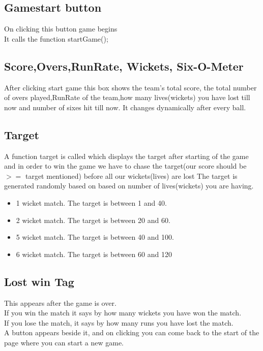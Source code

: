 \documentclass{article}
\begin{document}
\subsection{Gamestart button}
On clicking this button game begins\\
It calls the function startGame();
\subsection{Score,Overs,RunRate, Wickets, Six-O-Meter}
After clicking start game this box shows the team's total score, the total number of overs played,RunRate of the team,how many lives(wickets) you have lost till now and number of sixes hit till now. It changes dynamically after every ball.
\subsection{Target}
A function target is called which displays the target after starting of the game and in order to win the game we have to chase the target(our score should be $>=$ target mentioned) before all our wickets(lives) are lost
The target is generated randomly based on based on number of lives(wickets) you are having.
\begin{itemize}
    \item 1 wicket match. The target is between 1 and 40.
    \item 2 wicket match. The target is between 20 and 60.
    \item 5 wicket match. The target is between 40 and 100. 
    \item 6 wicket match. The target is between 60 and 120 
\end{itemize}
\subsection{Lost win Tag}
This appears after the game is over.\\
If you win the match it says by how many wickets you have won the match.\\
If you lose the match, it says by how many runs you have lost the match.\\
A button appears beside it, and on clicking you can come back to the start of the page where you can start a new game.
\end{document}
